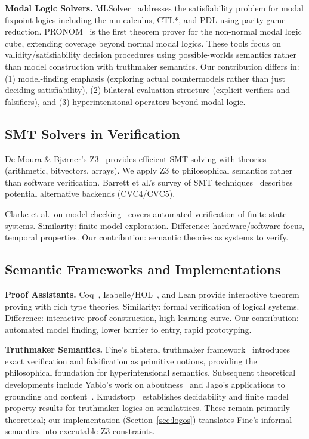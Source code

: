 \documentclass[pdflatex,sn-mathphys-num]{sn-jnl}
\theoremstyle{thmstyleone}
\theoremstyle{thmstyletwo}
\theoremstyle{thmstylethree}
\begin{document}
\textbf{Modal Logic Solvers.}
MLSolver~\cite{friedmann2010} addresses the satisfiability problem for modal fixpoint logics including the mu-calculus, CTL*, and PDL using parity game reduction.
PRONOM~\cite{pronom2021} is the first theorem prover for the non-normal modal logic cube, extending coverage beyond normal modal logics.
These tools focus on validity/satisfiability decision procedures using possible-worlds semantics rather than model construction with truthmaker semantics.
Our contribution differs in: (1) model-finding emphasis (exploring actual countermodels rather than just deciding satisfiability), (2) bilateral evaluation structure (explicit verifiers and falsifiers), and (3) hyperintensional operators beyond modal logic.

\subsection{SMT Solvers in Verification}\label{sec:smt-verification}

De Moura \& Bjørner's Z3~\cite{demoura2008} provides efficient SMT solving with theories (arithmetic, bitvectors, arrays).
We apply Z3 to philosophical semantics rather than software verification.
Barrett et al.'s survey of SMT techniques~\cite{barrett2009} describes potential alternative backends (CVC4/CVC5).

Clarke et al.\ on model checking~\cite{clarke1999} covers automated verification of finite-state systems.
Similarity: finite model exploration.
Difference: hardware/software focus, temporal properties.
Our contribution: semantic theories as systems to verify.

\subsection{Semantic Frameworks and Implementations}\label{sec:semantic-frameworks}

\textbf{Proof Assistants.}
Coq~\cite{bertot2004}, Isabelle/HOL~\cite{nipkow2002}, and Lean provide interactive theorem proving with rich type theories.
Similarity: formal verification of logical systems.
Difference: interactive proof construction, high learning curve.
Our contribution: automated model finding, lower barrier to entry, rapid prototyping.

\textbf{Truthmaker Semantics.}
Fine's bilateral truthmaker framework~\cite{fine2017tms,fine2017content} introduces exact verification and falsification as primitive notions, providing the philosophical foundation for hyperintensional semantics.
Subsequent theoretical developments include Yablo's work on aboutness~\cite{yablo2014} and Jago's applications to grounding and content~\cite{jago2020}.
Knudstorp~\cite{knudstorp2023} establishes decidability and finite model property results for truthmaker logics on semilattices.
These remain primarily theoretical; our implementation (Section~\ref{sec:logos}) translates Fine's informal semantics into executable Z3 constraints.
\end{document}
